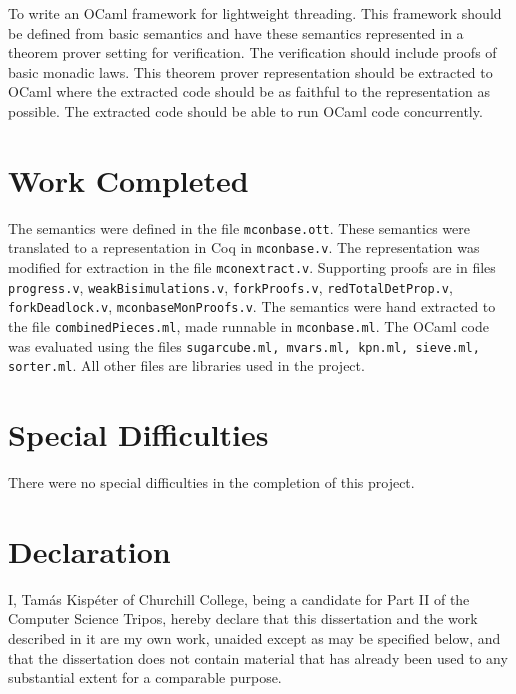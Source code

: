\documentclass[12pt,twoside,notitlepage]{report}
\theoremstyle{plain}%
\theoremstyle{definition}
\theoremstyle{remark}
\begin{document}
To write an OCaml framework for lightweight threading. This framework should be defined from basic semantics and have these semantics represented in a theorem prover setting for verification. The verification should include proofs of basic monadic laws. This theorem prover representation should be extracted to OCaml where the extracted code should be as faithful to the representation as possible. The extracted code should be able to run OCaml code concurrently.



\section*{Work Completed}

The semantics were defined in the file \verb|mconbase.ott|. These semantics were translated to a representation in Coq in \verb|mconbase.v|. The representation was modified for extraction in the file \verb|mconextract.v|. Supporting proofs are in files \verb|progress.v|, \verb|weakBisimulations.v|, \verb|forkProofs.v|, \verb|redTotalDetProp.v|, \verb|forkDeadlock.v|, \verb|mconbaseMonProofs.v|. The semantics were hand extracted to the file \verb|combinedPieces.ml|, made runnable in \verb|mconbase.ml|. The OCaml code was evaluated using the files \verb|sugarcube.ml, mvars.ml, kpn.ml, sieve.ml, sorter.ml|. All other files are libraries used in the project.

\section*{Special Difficulties}

There were no special difficulties in the completion of this project.
 
\newpage
\section*{Declaration}

I, Tam\'as Kisp\'eter of Churchill College, being a candidate for Part II of the Computer
Science Tripos, hereby declare
that this dissertation and the work described in it are my own work,
unaided except as may be specified below, and that the dissertation
does not contain material that has already been used to any substantial
extent for a comparable purpose.

\bigskip\bigskip


\leftline{\rule{12em}{1pt}}


\end{document}
